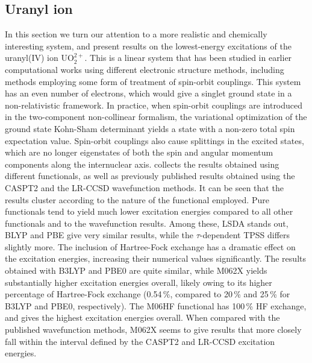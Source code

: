 \documentclass[12pt]{article}
\begin{document}
\subsection{Uranyl ion}
In this section we turn our attention to a more realistic and chemically interesting system, and present results on the lowest-energy excitations of the uranyl(IV) ion UO$_2^{2+}$.
This is a linear system that has been studied in earlier computational works using different electronic structure methods, including methods employing some form of treatment of spin-orbit couplings.\cite{Li16_3711,Saue09_2091,Baerends07_194311,Wahlgren07_214302,Pitzer99_6880,vanBesien05_204309}
This system has an even number of electrons, which would give a singlet ground state in a non-relativistic framework.
In practice, when spin-orbit couplings are introduced in the two-component non-collinear formalism, the variational optimization of the ground state Kohn-Sham determinant yields a state with a non-zero total spin expectation value.
Spin-orbit couplings also cause splittings in the excited states, which are no longer eigenstates of both the spin and angular momentum components along the internuclear axis.
 collects the results obtained using different functionals, as well as previously published results obtained using the CASPT2 and the LR-CCSD wavefunction methods.
It can be seen that the results cluster according to the nature of the functional employed.
Pure functionals tend to yield much lower excitation energies compared to all other functionals and to the wavefunction results.
Among these, LSDA stands out, BLYP and PBE give very similar results, while the $\tau$-dependent TPSS differs slightly more.
The inclusion of Hartree-Fock exchange has a dramatic effect on the excitation energies, increasing their numerical values significantly.
The results obtained with B3LYP and PBE0 are quite similar, while M062X yields substantially higher excitation energies overall, likely owing to its higher percentage of Hartree-Fock exchange (0.54\,\%, compared to 20\,\% and 25\,\% for B3LYP and PBE0, respectively).
The M06HF functional has 100\,\% HF exchange, and gives the highest excitation energies overall.
When compared with the published wavefunction methods, M062X seems to give results that more closely fall within the interval defined by the CASPT2\cite{vanBesien05_204309} and LR-CCSD\cite{Wahlgren07_214302} excitation energies.
\end{document}
